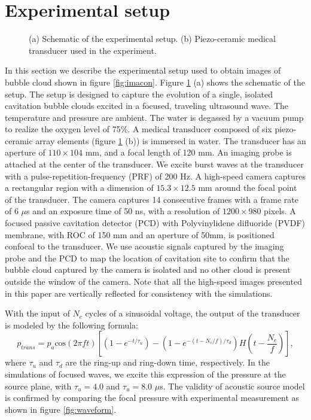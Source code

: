\documentclass{jfm}
\begin{document}
\section{Experimental setup}
\begin{figure}
  \center
  \caption{(a) Schematic of the experimental setup. (b) Piezo-ceramic medical transducer used in the experiment.
   }
   \label{fig:exp} 
\end{figure}
In this section we describe the experimental setup used to obtain images of bubble cloud shown in figure \ref{fig:imacon}.
Figure \ref{fig:exp} (a) shows the schematic of the setup.
The setup is designed to capture the evolution of a single, isolated cavitation bubble clouds excited in a focused, traveling ultrasound wave.
The temperature and pressure are ambient.
The water is degassed by a vacuum pump to realize the oxygen level of 75\%.
A medical transducer composed of six piezo-ceramic array elements (figure \ref{fig:exp} (b)) is immersed in water.
The transducer has an aperture of $110\times104$ mm, and a focal length of 120 mm.
An imaging probe is attached at the center of the transducer.
We excite burst waves at the transducer with a pulse-repetition-frequency (PRF) of 200 Hz.
A high-speed camera captures a rectangular region with a dimension of $15.3\times12.5$ mm around the focal point of the transducer.
The camera captures 14 consecutive frames with a frame rate of 6 $\mu$s and an exposure time of 50 ns, with a resolution of $1200\times980$ pixels.
A focused passive cavitation detector (PCD) with Polyvinylidene difluoride (PVDF) membrane, with ROC of 150 mm and an aperture of 50mm, is positioned confocal to the transducer. We use acoustic signals captured by the imaging probe and the PCD to map the location of cavitation site to confirm that the bubble cloud captured by the camera is isolated and no other cloud is present outside the window of the camera.
Note that all the high-speed images presented in this paper are vertically reflected for consistency with the simulations.

With the input of $N_c$ cycles of a sinusoidal voltage, the output of the transducer is modeled by the following formula:
\begin{equation}
p_{trans} = p_a\mathrm{cos}(2\pi ft)[(1-e^{-t/\tau_u})-(1-e^{-(t-N_c/f)/\tau_d})H(t-\frac{N_c}{f})],
\end{equation}
where $\tau_u$ and $\tau_d$ are the ring-up and ring-down time, respectively.
In the simulations of focused waves, we excite this expression of the pressure at the source plane, with $\tau_u=4.0$ and $\tau_u=8.0$ $\mu$s.
The validity of acoustic source model is confirmed by comparing the focal pressure with experimental measurement as shown in figure \ref{fig:waveform}.
\end{document}
